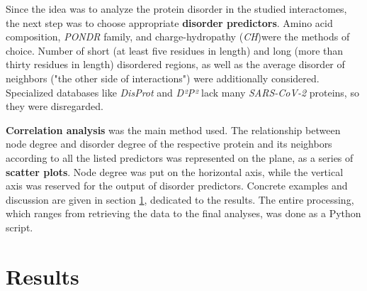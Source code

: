 \documentclass[a4paper]{article}
\begin{document}
Since the idea was to analyze the protein disorder in the studied interactomes, the next step was to choose appropriate \textbf{disorder predictors}. Amino acid composition\footnotemark,  \textit{PONDR}\footnotemark {} family, and charge-hydropathy (\textit{CH})\footnotemark[6] were the methods of choice. Number of short (at least five residues in length) and long (more than thirty residues in length) disordered regions, as well as the average disorder of neighbors ("the other side of interactions") were additionally considered. Specialized databases like \textit{DisProt} and \textit{D²P²} lack many \textit{SARS-CoV-2} proteins, so they were disregarded.

\textbf{Correlation analysis} was the main method used. The relationship between node degree and disorder degree of the respective protein and its neighbors according to all the listed predictors was represented on the plane, as a series of \textbf{scatter plots}. Node degree was put on the horizontal axis, while the vertical axis was reserved for the output of disorder predictors. Concrete examples and discussion are given in section \ref{res}, dedicated to the results. The entire processing, which ranges from retrieving the data to the final analyses, was done as a Python\footnotemark {} script.

\section{Results}
\label{res}

\newpage
{}
\appendix
 

\end{document}
